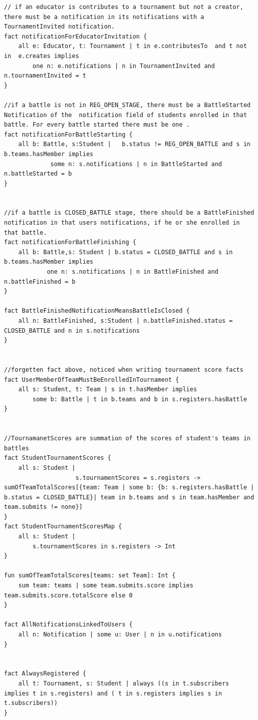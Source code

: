 \begin{lstlisting}[language=alloy]
// if an educator is contributes to a tournament but not a creator, there must be a notification in its notifications with a TournamentInvited notification. 
fact notificationForEducatorInvitation {
    all e: Educator, t: Tournament | t in e.contributesTo  and t not in  e.creates implies
        one n: e.notifications | n in TournamentInvited and n.tournamentInvited = t
}

//if a battle is not in REG_OPEN_STAGE, there must be a BattleStarted Notification of the  notification field of students enrolled in that battle. For every battle started there must be one .
fact notificationForBattleStarting {
    all b: Battle, s:Student |	 b.status != REG_OPEN_BATTLE and s in b.teams.hasMember implies 
             some n: s.notifications | n in BattleStarted and n.battleStarted = b
}


//if a battle is CLOSED_BATTLE stage, there should be a BattleFinished notification in that users notifications, if he or she enrolled in that battle.
fact notificationForBattleFinishing {
    all b: Battle,s: Student | b.status = CLOSED_BATTLE and s in b.teams.hasMember implies 
            one n: s.notifications | n in BattleFinished and n.battleFinished = b
}

fact BattleFinishedNotificationMeansBattleIsClosed {
    all n: BattleFinished, s:Student | n.battleFinished.status = CLOSED_BATTLE and n in s.notifications
}


//forgetten fact above, noticed when writing tournament score facts 
fact UserMemberOfTeamMustBeEnrolledInTournament {
    all s: Student, t: Team | s in t.hasMember implies 
        some b: Battle | t in b.teams and b in s.registers.hasBattle
}


//TournamanetScores are summation of the scores of student's teams in battles
fact StudentTournamentScores {
    all s: Student | 
                    s.tournamentScores = s.registers -> sumOfTeamTotalScores[{team: Team | some b: {b: s.registers.hasBattle | b.status = CLOSED_BATTLE}| team in b.teams and s in team.hasMember and team.submits != none}]
}
fact StudentTournamentScoresMap {
    all s: Student | 
        s.tournamentScores in s.registers -> Int
}

fun sumOfTeamTotalScores[teams: set Team]: Int {
    sum team: teams | some team.submits.score implies team.submits.score.totalScore else 0
}

fact AllNotificationsLinkedToUsers {
    all n: Notification | some u: User | n in u.notifications
}


fact AlwaysRegistered {
    all t: Tournament, s: Student | always ((s in t.subscribers implies t in s.registers) and ( t in s.registers implies s in t.subscribers))
}


\end{lstlisting}

